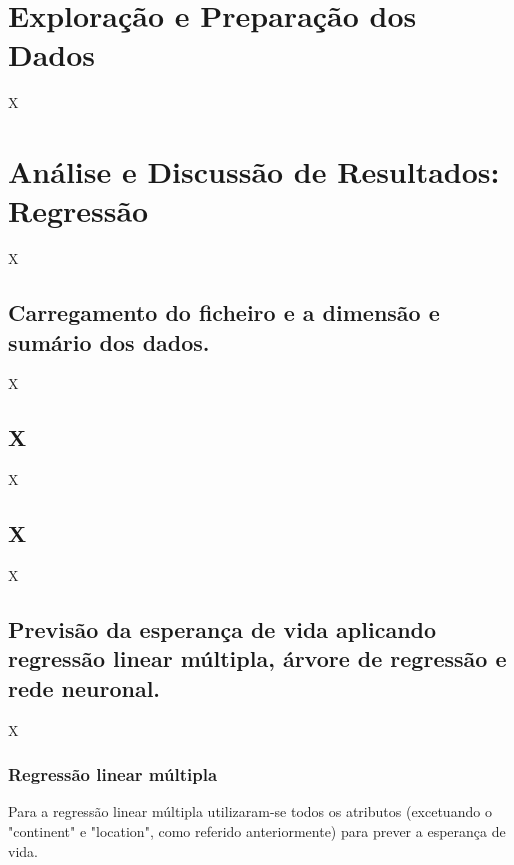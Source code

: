 \documentclass[conference]{IEEEtran}
\begin{document}
\section{Exploração e Preparação dos Dados} %
X



\section{Análise e Discussão de Resultados: Regressão} %
X

\subsection{Carregamento do ficheiro e a dimensão e sumário dos dados.} 
\label{ex01}
X


\subsection{X}
X


\subsection{X}
X


\subsection{Previsão da esperança de vida aplicando regressão linear múltipla, árvore de regressão e rede neuronal.}
X

\subsubsection{Regressão linear múltipla}
Para a regressão linear múltipla utilizaram-se todos os atributos (excetuando o "continent" e "location", como referido anteriormente) para prever a esperança de vida.
\end{document}
